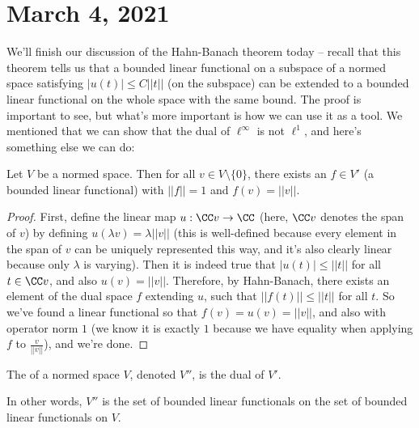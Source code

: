 
\pagebreak\section*{March 4, 2021}

We'll finish our discussion of the Hahn-Banach theorem today -- recall that this theorem tells us that a bounded linear functional on a subspace of a normed space satisfying $|u(t)| \le C||t||$ (on the subspace) can be extended to a bounded linear functional on the whole space with the same bound. The proof is important to see, but what's more important is how we can use it as a tool. We mentioned that we can show that the dual of $\ell^{\infty}$ is not $\ell^1$, and here's something else we can do:

\begin{theorem}\label{hahnbanachapp1}
Let $V$ be a normed space. Then for all $v \in V \setminus \{0\}$, there exists an $f \in V'$ (a bounded linear functional) with $||f|| = 1$ and $f(v) = ||v||$.
\end{theorem}
\begin{proof}
First, define the linear map $u: \CC v \to \CC$ (here, $\CC v$ denotes the span of $v$) by defining $u(\lambda v) = \lambda ||v||$ (this is well-defined because every element in the span of $v$ can be uniquely represented this way, and it's also clearly linear because only $\lambda$ is varying). Then it is indeed true that $|u(t)| \le ||t||$ for all $t \in \CC v$, and also $u(v) = ||v||$. Therefore, by Hahn-Banach, there exists an element of the dual space $f$ extending $u$, such that $||f(t)|| \le ||t||$ for all $t$. So we've found a linear functional so that $f(v) = u(v) = ||v||$, and also with operator norm $1$ (we know it is exactly $1$ because we have equality when applying $f$ to $\frac{v}{||v||}$), and we're done. 
\end{proof}

\begin{definition}
The  of a normed space $V$, denoted $V''$, is the dual of $V'$.
\end{definition}

In other words, $V''$ is the set of bounded linear functionals on the set of bounded linear functionals on $V$. 

